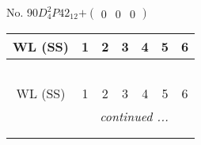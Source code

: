 \documentclass[fleqn,9pt,landscape]{jsarticle}
\begin{document}
\newpage
No. 90\quad$D_{4}^{2}$\quad$P42_12$\quad[ tetragonal ]\quad$+\begin{pmatrix} 0 & 0 & 0 \end{pmatrix}$
\begin{center}
\renewcommand{\arraystretch}{1.2}
\begin{longtable}{ccccccc}
 \hline \hline
WL (SS) & 1 & 2 & 3 & 4 & 5 & 6 \\ \hline \endfirsthead

\multicolumn{6}{l}{\tablename\ \thetable{}} \\
 \hline \hline
WL (SS) & 1 & 2 & 3 & 4 & 5 & 6 \\ \hline \endhead

 \hline \hline
\multicolumn{6}{r}{\footnotesize\it continued ...} \\ \endfoot

 \hline \hline
\multicolumn{6}{r}{} \\ \endlastfoot


\end{longtable}
\end{center}
\end{document}
